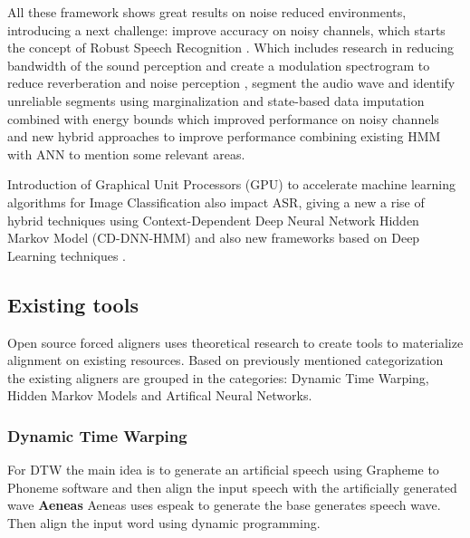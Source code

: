 All these framework shows great results on noise reduced environments, introducing a next challenge: improve accuracy on noisy channels, which starts the concept of Robust Speech Recognition \cite{SieglerOnSystems,MirghaforiTowardsASR}. Which includes research in reducing bandwidth of the sound perception and create a modulation spectrogram to reduce reverberation and noise perception \cite{Kingsbury1998RobustSpectrogram}, segment the audio wave and identify unreliable segments using marginalization and state-based data imputation combined with energy bounds which improved performance on noisy channels \cite{Cooke2001RobustData} and new hybrid approaches to improve performance combining existing HMM with ANN \cite{BourlardABands} to mention some relevant areas.

Introduction of Graphical Unit Processors (GPU) to accelerate machine learning algorithms for Image Classification \cite{KrizhevskyImageNetNetworks} also impact ASR, giving a new a rise of hybrid techniques using Context-Dependent Deep Neural Network Hidden Markov Model (CD-DNN-HMM) \cite{Yu_2014_1,Xiong2017} and also new frameworks based on Deep Learning techniques \cite{Povey_ASRU2011,1401.6984}.


\subsection{Existing tools}

Open source forced aligners uses theoretical research to create tools to materialize alignment on existing resources. Based on previously mentioned categorization the existing aligners are grouped in the categories: Dynamic Time Warping, Hidden Markov Models and Artifical Neural Networks.

\subsubsection{Dynamic Time Warping}

For DTW the main idea is to generate an artificial speech using Grapheme to Phoneme  software and then align the input speech with the artificially generated wave
\textbf{Aeneas}
Aeneas \cite{aeneas} uses espeak \cite{espeak} to generate the base generates speech wave. Then align the input word using dynamic programming.

